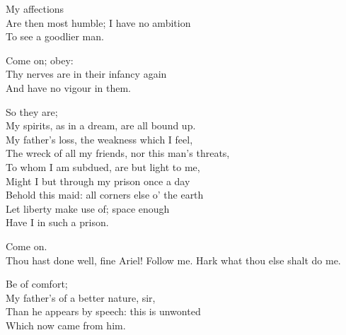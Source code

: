 \begin{verse_speech}[Miranda] 
My affections\\
Are then most humble; I have no ambition\\
To see a goodlier man.
\end{verse_speech}

\begin{verse_speech}[Prospero] 
Come on; obey:\\
Thy nerves are in their infancy again\\
And have no vigour in them.
\end{verse_speech}

\begin{verse_speech}[Ferdinand] 
So they are;\\
My spirits, as in a dream, are all bound up.\\
My father's loss, the weakness which I feel,\\
The wreck of all my friends, nor this man's threats,\\
To whom I am subdued, are but light to me,\\
Might I but through my prison once a day\\
Behold this maid: all corners else o' the earth\\
Let liberty make use of; space enough\\
Have I in such a prison.
\end{verse_speech}

\begin{verse_speech}[Prospero] 
Come on.\\
Thou hast done well, fine Ariel!
Follow me.
Hark what thou else shalt do me.
\end{verse_speech}

\begin{verse_speech}[Miranda] 
Be of comfort;\\
My father's of a better nature, sir,\\
Than he appears by speech: this is unwonted\\
Which now came from him.
\end{verse_speech}

